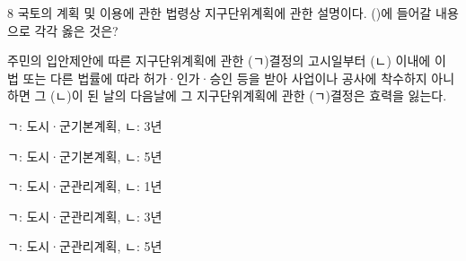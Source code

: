 \begin{question}{8}
국토의 계획 및 이용에 관한 법령상 지구단위계획에 관한 설명이다. (\quad)에 들어갈 내용으로 각각 옳은 것은?
\begin{framedtext}
주민의 입안제안에 따른 지구단위계획에 관한 (ㄱ)결정의 고시일부터 (ㄴ) 이내에 이 법 또는 다른 법률에 따라 허가·인가·승인 등을 받아 사업이나 공사에 착수하지 아니하면 그 (ㄴ)이 된 날의 다음날에 그 지구단위계획에 관한 (ㄱ)결정은 효력을 잃는다.
\end{framedtext}
\begin{choices}
  \item ㄱ: 도시·군기본계획, ㄴ: 3년
  \item ㄱ: 도시·군기본계획, ㄴ: 5년
  \item ㄱ: 도시·군관리계획, ㄴ: 1년
  \item ㄱ: 도시·군관리계획, ㄴ: 3년
  \item ㄱ: 도시·군관리계획, ㄴ: 5년
\end{choices}
\end{question}
